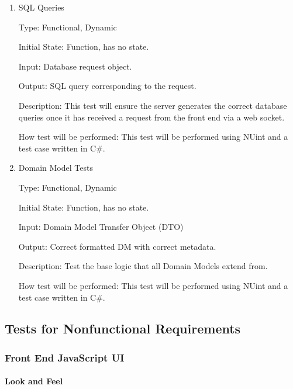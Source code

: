 \documentclass[12pt, titlepage]{article}
\begin{document}
    \begin{enumerate}

      \item{SQL Queries\\}

      Type: Functional, Dynamic

      Initial State: Function, has no state.

      Input: Database request object.

      Output: SQL query corresponding to the request.
                
      Description: This test will ensure the server generates the correct database
      queries once it has received a request from the front end via a web socket.

      How test will be performed: This test will be performed using NUint and a test
      case written in C\#.

      \item{Domain Model Tests\\}

      Type: Functional, Dynamic

      Initial State: Function, has no state.

        Input: Domain Model Transfer Object (DTO)

      Output: Correct formatted DM with correct metadata.

      Description: Test the base logic that all Domain Models extend from.

      How test will be performed: This test will be performed using NUint and a test
      case written in C\#.

    \end{enumerate}

\subsection{Tests for Nonfunctional Requirements}

  \subsubsection{Front End JavaScript UI}
      
    \paragraph{Look and Feel}
\end{document}
